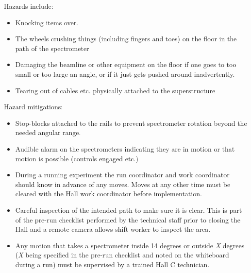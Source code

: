 \begin{safetyen}{0}{0}

Hazards include:
\begin{itemize}
\item{Knocking items over.}
\item{The wheels crushing things (including fingers and toes) on the floor in the path of the 
spectrometer}
\item{Damaging the beamline or other equipment on the floor if one goes to too small 
or too large an angle, or if it just gets pushed around inadvertently.}
\item{Tearing out of cables etc. physically attached to the superstructure}
\end{itemize}


Hazard mitigations:
\begin{itemize}
\item{Stop-blocks attached to the rails to prevent spectrometer rotation beyond the needed angular range.}
\item{Audible alarm on the spectrometers indicating they are in motion or that motion
is possible (controls engaged etc.)}
\item{During a running experiment the run coordinator and work coordinator should know in advance 
of any moves.  Moves at any other time must be cleared with the Hall work coordinator 
before implementation.}
\item{Careful inspection of the intended path to make sure it is clear. This is part of
the pre-run checklist performed by the technical staff prior to closing the Hall and
a remote camera allows shift worker to inspect the area.}
\item{Any motion that takes a spectrometer inside 14 degrees or outside \emph{X} degrees
(\emph{X} being specified in the pre-run checklist and noted on the whiteboard during a run) 
must be supervised by a trained Hall C technician.}
\end{itemize}
\end{safetyen}

